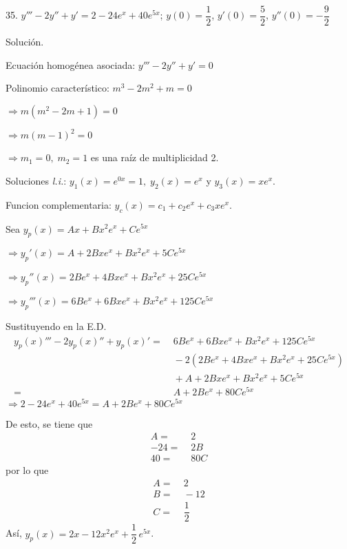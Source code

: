 \documentclass[fleqn]{article}
\begin{document}
    35. $ y''' - 2y'' + y' = 2 - 24e^x + 40e^{5x} $; \; $ y(0) = \dfrac{1}{2} $, \; $ y'(0) = \dfrac{5}{2} $, \; $ y''(0) = - \dfrac{9}{2} $

    Solución.

    Ecuación homogénea asociada: $ y''' - 2y'' + y' = 0 $

    Polinomio característico: $ m^3 - 2m^2 + m = 0 $

    \hspace{3.2cm} $ \Longrightarrow m(m^2 - 2m + 1) = 0 $

    \hspace{3.2cm} $ \Longrightarrow m(m - 1)^2 = 0 $

    \hspace{3.2cm} $ \Longrightarrow m_1 = 0, \; m_2 = 1 $ es una raíz de multiplicidad 2.

    Soluciones \textit{l.i.}: $ y_1(x) = e^{0x} = 1, \; y_2(x) = e^x $ y $ y_3(x) = xe^x $.

    Funcion complementaria: $ y_c(x) = c_1 + c_2e^x + c_3xe^x $.

    Sea $ y_p(x) = Ax + Bx^2e^x + Ce^{5x} $

    $ \Longrightarrow y_p'(x) = A + 2Bxe^x + Bx^2e^x + 5Ce^{5x} $

    $ \Longrightarrow y_p''(x) = 2Be^x + 4Bxe^x + Bx^2e^x + 25Ce^{5x} $

    $ \Longrightarrow y_p'''(x) = 6Be^x + 6Bxe^x + Bx^2e^x + 125Ce^{5x} $

    Sustituyendo en la E.D.
    \begin{align*}
        y_p(x)''' - 2y_p(x)'' + y_p(x)' =& \; 6Be^x + 6Bxe^x + Bx^2e^x + 125Ce^{5x} \\ & \; - 2 \left(2Be^x + 4Bxe^x + Bx^2e^x  + 25Ce^{5x} \right) \\ & \; + A + 2Bxe^x + Bx^2e^x + 5Ce^{5x} \\
        =& \; A + 2Be^x + 80Ce^{5x}
    \end{align*}
    $ \Longrightarrow 2 - 24e^x + 40e^{5x} = A + 2Be^x + 80Ce^{5x} $

    De esto, se tiene que 
    \begin{align*}
        A =& \; 2 \\
        -24 =& \; 2B \\
        40 =& \; 80C
    \end{align*}
    por lo que
    \begin{align*}
        A =& \; 2 \\
        B =& \; -12 \\
        C =& \; \dfrac{1}{2}
    \end{align*}
    Así, $ y_p(x) = 2x - 12x^2e^x + \dfrac{1}{2} \, e^{5x} $.
\end{document}
